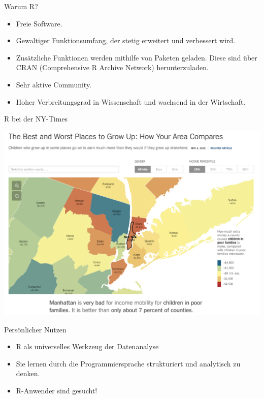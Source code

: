 \documentclass[ignorenonframetext,]{beamer}
\begin{document}
\begin{frame}{Warum R?}

\begin{itemize}
\itemsep1pt\parskip0pt
\item
  Freie Software.
\item
  Gewaltiger Funktionsumfang, der stetig erweitert und verbessert wird.
\item
  Zusätzliche Funktionen werden mithilfe von Paketen geladen. Diese sind
  über CRAN (Comprehensive R Archive Network) herunterzuladen.
\item
  Sehr aktive Community.
\item
  Hoher Verbreitungsgrad in Wissenschaft und wachsend in der Wirtschaft.
\end{itemize}

\end{frame}

\begin{frame}{R bei der NY-Times}

\includegraphics{../fig/ny-times.png}

\end{frame}

\begin{frame}{Persönlicher Nutzen}

\begin{itemize}
\itemsep1pt\parskip0pt
\item
  R als universelles Werkzeug der Datenanalyse
\item
  Sie lernen durch die Programmiersprache strukturiert und analytisch zu
  denken.
\item
  R-Anwender sind gesucht!
\end{itemize}

\end{frame}
\end{document}
